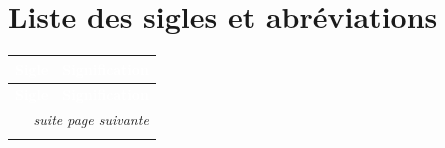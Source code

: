 \chapter*{Liste des sigles et abréviations}

\begin{longtable}{@{}p{3.2cm}p{11.4cm}@{}}
\rowcolor{argosblue}\textcolor{white}{\bfseries Sigle} & \textcolor{white}{\bfseries Signification} \\
\endfirsthead
\rowcolor{argosblue}\textcolor{white}{\bfseries Sigle} & \textcolor{white}{\bfseries Signification} \\
\endhead
\hline
\multicolumn{2}{r}{\small\textit{suite page suivante}}\\
\endfoot
\hline
\endlastfoot
	

\end{longtable}

